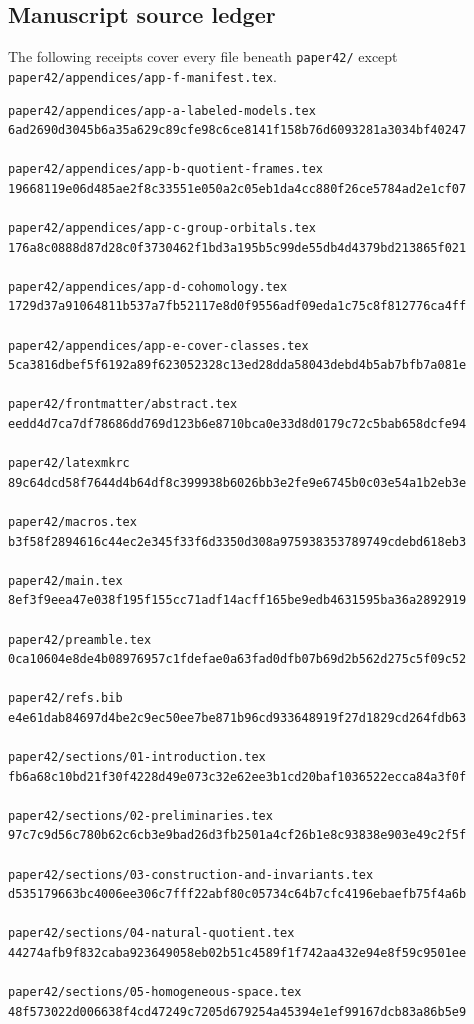 \subsection{Manuscript source ledger}

The following receipts cover every file beneath
\texttt{paper42/} except
\texttt{paper42/appendices/app-f-manifest.tex}.

\begin{verbatim}
paper42/appendices/app-a-labeled-models.tex
6ad2690d3045b6a35a629c89cfe98c6ce8141f158b76d6093281a3034bf40247

paper42/appendices/app-b-quotient-frames.tex
19668119e06d485ae2f8c33551e050a2c05eb1da4cc880f26ce5784ad2e1cf07

paper42/appendices/app-c-group-orbitals.tex
176a8c0888d87d28c0f3730462f1bd3a195b5c99de55db4d4379bd213865f021

paper42/appendices/app-d-cohomology.tex
1729d37a91064811b537a7fb52117e8d0f9556adf09eda1c75c8f812776ca4ff

paper42/appendices/app-e-cover-classes.tex
5ca3816dbef5f6192a89f623052328c13ed28dda58043debd4b5ab7bfb7a081e

paper42/frontmatter/abstract.tex
eedd4d7ca7df78686dd769d123b6e8710bca0e33d8d0179c72c5bab658dcfe94

paper42/latexmkrc
89c64dcd58f7644d4b64df8c399938b6026bb3e2fe9e6745b0c03e54a1b2eb3e

paper42/macros.tex
b3f58f2894616c44ec2e345f33f6d3350d308a975938353789749cdebd618eb3

paper42/main.tex
8ef3f9eea47e038f195f155cc71adf14acff165be9edb4631595ba36a2892919

paper42/preamble.tex
0ca10604e8de4b08976957c1fdefae0a63fad0dfb07b69d2b562d275c5f09c52

paper42/refs.bib
e4e61dab84697d4be2c9ec50ee7be871b96cd933648919f27d1829cd264fdb63

paper42/sections/01-introduction.tex
fb6a68c10bd21f30f4228d49e073c32e62ee3b1cd20baf1036522ecca84a3f0f

paper42/sections/02-preliminaries.tex
97c7c9d56c780b62c6cb3e9bad26d3fb2501a4cf26b1e8c93838e903e49c2f5f

paper42/sections/03-construction-and-invariants.tex
d535179663bc4006ee306c7fff22abf80c05734c64b7cfc4196ebaefb75f4a6b

paper42/sections/04-natural-quotient.tex
44274afb9f832caba923649058eb02b51c4589f1f742aa432e94e8f59c9501ee

paper42/sections/05-homogeneous-space.tex
48f573022d006638f4cd47249c7205d679254a45394e1ef99167dcb83a86b5e9


\end{verbatim}
